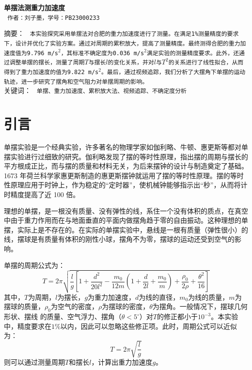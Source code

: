 \documentclass[a4paper]{extarticle}
\begin{document}
    \begin{center}
        \textbf{\fontsize{22pt}{\baselineskip} \selectfont 单摆法测重力加速度}\\
        \vspace{2em}
        \texttt{\fontsize{14pt}{\baselineskip} \selectfont 作者：刘子墨，学号：PB23000233}\\
    \end{center}
    \vspace{2em}
    \textsf{\fontsize{9pt}{\baselineskip} \selectfont 摘要：}
    \texttt{\fontsize{9pt}{\baselineskip} \selectfont 本实验探究采用单摆法对合肥的重力加速度进行了测量。在满足1\%测量精度的要求下，设计并优化了实验方案。通过对周期的累积放大，提高了测量精度。最终测得合肥的重力加速度值为9.796 m/s$^2$，其标准不确定度为0.036 m/s$^2$满足实验的测量精度要求。此外，还通过调整单摆的摆长，测量了周期$T$与摆长$l$的变化关系，并对$l$与$T^2$的关系进行了线性拟合，从而得到了重力加速度的值为9.822 m/s$^2$。最后，通过视频追踪，我们分析了大摆角下单摆的运动轨迹，进一步研究了摆角和空气阻力对单摆周期的影响。}\\
    \textsf{\fontsize{9pt}{\baselineskip} \selectfont 关键词：}
    \texttt{\fontsize{9pt}{\baselineskip} \selectfont 单摆、重力加速度、累积放大法、视频追踪、不确定度分析}
    \section{引言}
    \hspace{2em}
    单摆实验是一个经典实验，许多著名的物理学家如伽利略、牛顿、惠更斯等都对单摆实验进行过细致的研究。伽利略发现了摆的等时性原理，指出摆的周期与摆长的平方根成正比，而与摆的质量和材料无关，为后来摆钟的设计与制造奠定了基础。1673 年荷兰科学家惠更斯制造的惠更斯摆钟就运用了摆的等时性原理。摆的等时性原理应用于时钟上，作为稳定的“定时器”，使机械钟能够指示出“秒”，从而将计时精度提高了近 100 倍。
    \par\hspace{2em}
    理想的单摆，是一根没有质量、没有弹性的线，系住一个没有体积的质点，在真空中由于重力作用而在与地面垂直的平面内做摆角趋于零的自由振动。这种理想的单摆，实际上是不存在的。在实际的单摆实验中，悬线是一根有质量（弹性很小）的线，摆球是有质量有体积的刚性小球，摆角不为零，摆球的运动还受到空气的影响。
    \par\hspace{2em}
    单摆的周期公式为：
    \begin{equation*}
        T=2\pi\sqrt{\frac{l}{g}\left[1+\frac{d^2}{20l^2}-\frac{m_0}{12m}\left(1+\frac{d}{2l}+\frac{m_0}{m}\right)+\frac{\rho_0}{2\rho}+\frac{\theta^2}{16}\right]}
    \end{equation*}
    其中，$T$为周期，$l$为摆长，$g$为重力加速度，$d$为线的直径，$m_0$为线的质量，$m$为摆球的质量，$\rho_0$为空气的密度，$\rho$为摆球的密度，$\theta$为摆角。一般情况下，摆球几何形状、摆线
    的质量、空气浮力、摆角（$\theta<5^{\circ}$）对$T$的修正都小于$10^{-3}$。本实验中，精度要求在$1\%$以内，因此可以忽略这些修正项。此时，周期公式可以近似为：
    \begin{equation*}
        T=2\pi\sqrt{\frac{l}{g}}
    \end{equation*}
    则可以通过测量周期$T$和摆长$l$，计算出重力加速度$g$。
\end{document}

